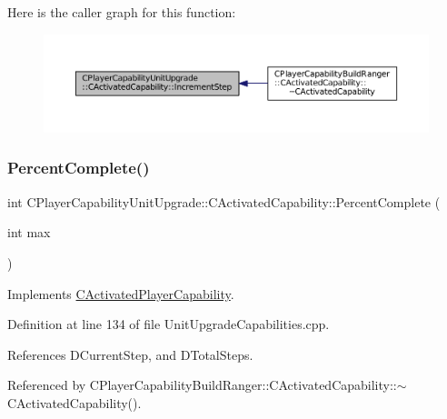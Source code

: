 Here is the caller graph for this function\+:\nopagebreak
\begin{figure}[H]
\begin{center}
\leavevmode
\includegraphics[width=350pt]{classCPlayerCapabilityUnitUpgrade_1_1CActivatedCapability_a86833312cb2f2460e923808fe0e19223_icgraph}
\end{center}
\end{figure}
\hypertarget{classCPlayerCapabilityUnitUpgrade_1_1CActivatedCapability_a16026f30b1ec10fbd4cb7049d0b74719}{}\label{classCPlayerCapabilityUnitUpgrade_1_1CActivatedCapability_a16026f30b1ec10fbd4cb7049d0b74719} 
\subsubsection{\texorpdfstring{Percent\+Complete()}{PercentComplete()}}
{\footnotesize\ttfamily int C\+Player\+Capability\+Unit\+Upgrade\+::\+C\+Activated\+Capability\+::\+Percent\+Complete (\begin{DoxyParamCaption}\item[{int}]{max }\end{DoxyParamCaption})\hspace{0.3cm}{\ttfamily [virtual]}}



Implements \hyperlink{classCActivatedPlayerCapability_a405dc6076058006a4f801727de4cfe4d}{C\+Activated\+Player\+Capability}.



Definition at line 134 of file Unit\+Upgrade\+Capabilities.\+cpp.



References D\+Current\+Step, and D\+Total\+Steps.



Referenced by C\+Player\+Capability\+Build\+Ranger\+::\+C\+Activated\+Capability\+::$\sim$\+C\+Activated\+Capability().


